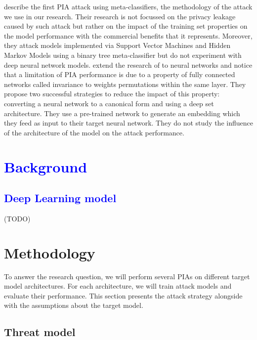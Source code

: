 \documentclass[11pt]{article}
\begin{document}
\citet{Ateniese2015} describe the first PIA attack using meta-classifiers, the methodology of the attack we use in our research. Their research is not focussed on the privacy leakage caused by such attack but rather on the impact of the training set properties on the model performance with the commercial benefits that it represents. Moreover, they attack models implemented via Support Vector Machines and Hidden Markov Models using a binary tree meta-classifier but do not experiment with deep neural network models. \citet{Ganju2018} extend the research of \citet{Ateniese2015} to neural networks and notice that a limitation of PIA performance is due to a property of fully connected networks called invariance to weights permutations within the same layer. They propose two successful strategies to reduce the impact of this property: converting a neural network to a canonical form and using a deep set architecture. They use a pre-trained network to generate an embedding which they feed as input to their target neural network. They do not study the influence of the architecture of the model on the attack performance.\\


\section{\textcolor{blue}{Background}}

\subsection{\textcolor{blue}{Deep Learning model}}
(TODO)

\section{Methodology}
To answer the research question, we will perform several PIAs on different target model architectures. For each architecture, we will train attack models and evaluate their performance. This section presents the attack strategy alongside with the assumptions about the target model. \\

\subsection{Threat model}
\end{document}
